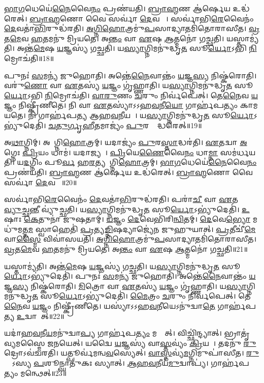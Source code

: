 \ul{𑌭𑌾}\ul{𑌗}𑌧𑍇𑌯𑍇॑\ul{𑌨𑍈}𑌵𑍈\ul{𑌨𑌂} 𑌪𑍍𑌰𑌣॑𑌯𑌤𑌿।
\ul{𑌬𑍍𑌰𑌾}\ul{𑌹𑍍𑌮}𑌣 𑌆॑𑌰𑍍\mbox{}\ul{𑌷𑍇}𑌯 𑌉𑌦𑍍𑌧॑𑌰𑍇𑌤𑍍।
\ul{𑌬𑍍𑌰𑌾}\ul{𑌹𑍍𑌮}𑌣𑍋 𑌵𑍈 𑌸𑌰𑍍𑌵𑌾॑ \ul{𑌦𑍇}𑌵𑌤𑌾𑌃᳚।
𑌸𑌰𑍍𑌵𑌾॑𑌭𑌿\ul{𑌰𑍇}𑌵𑍈𑌨𑌂॑ \ul{𑌦𑍇}𑌵𑌤𑌾॑\ul{𑌭𑌿}𑌰𑍁𑌦𑍍𑌧॑𑌰𑌤𑌿।
\ul{𑌅}\ul{𑌗𑍍𑌨𑌿}\ul{𑌹𑍋}𑌤𑍍𑌰𑌮𑍁॑\ul{𑌪}𑌸𑌾𑌦𑍍𑌯𑌾𑌤𑌮𑌿॑𑌤𑍋𑌰𑌾𑌸𑍀𑌤।
\ul{𑌵𑍍𑌰}𑌤\ul{𑌮𑍇}𑌵 \ul{𑌹}𑌤𑌮𑌨𑍁॑ 𑌮𑍍𑌰𑌿𑌯𑌤𑍇।
𑌅\ul{𑌨𑍍𑌤𑌂} 𑌵𑌾 \ul{𑌏}𑌷 \ul{𑌆}𑌤𑍍𑌮𑌨𑍋॑ 𑌗𑌚𑍍𑌛𑌤𑌿।
𑌯𑌸𑍍𑌤𑌾𑌮𑍍𑌯॑𑌤𑌿।
𑌅𑌨𑍍𑌤॑\ul{𑌮𑍇}𑌷 \ul{𑌯}𑌜𑍍𑌞𑌸𑍍𑌯॑ 𑌗𑌚𑍍𑌛𑌤𑌿।
𑌯\ul{𑌸𑍍𑌯𑌾}𑌗𑍍𑌨𑌿𑌮𑌨𑍁॑𑌦𑍍𑌧𑍃\ul{𑌤}\ul{} 𑌸𑍂\ul{𑌰𑍍𑌯𑍋}𑌽𑌭𑌿 \ul{𑌨𑌿}𑌮𑍍𑌰𑍋𑌚॑𑌤𑌿॥18॥

𑌪𑍁𑌨𑌃॑ \ul{𑌸}𑌮𑌨𑍍𑌯॑ 𑌜𑍁𑌹𑍋𑌤𑌿।
𑌅𑌨𑍍𑌤𑍇॑\ul{𑌨𑍈}𑌵𑌾𑌨𑍍𑌤𑌂॑ \ul{𑌯}𑌜𑍍𑌞\ul{𑌸𑍍𑌯} 𑌨𑌿𑌷𑍍𑌕॑𑌰𑍋𑌤𑌿।
𑌵𑌰𑍁॑\ul{𑌣𑍋} 𑌵𑌾 \ul{𑌏}𑌤𑌸𑍍𑌯॑ \ul{𑌯}𑌜𑍍𑌞𑌂 𑌗𑍃॑𑌹𑍍𑌣𑌾𑌤𑌿।
𑌯\ul{𑌸𑍍𑌯𑌾}𑌗𑍍𑌨𑌿𑌮𑌨𑍁॑𑌦𑍍𑌧𑍃\ul{𑌤}\ul{} 𑌸𑍂\ul{𑌰𑍍𑌯𑍋}𑌽𑌭𑌿 \ul{𑌨𑌿}𑌮𑍍𑌰𑍋𑌚॑𑌤𑌿।
\ul{𑌵𑌾}\ul{𑌰𑍁}𑌣𑌂 \ul{𑌚}𑌰𑍁𑌂 𑌨𑌿𑌰𑍍𑌵॑𑌪𑍇𑌤𑍍।
𑌤𑍇\ul{𑌨𑍈}𑌵 \ul{𑌯}𑌜𑍍𑌞𑌂 𑌨𑌿𑌷𑍍𑌕𑍍𑌰𑍀॑𑌣𑍀𑌤𑍇।
𑌨𑌿 𑌵𑌾 \ul{𑌏}𑌤𑌸𑍍𑌯𑌾॑\-𑌽𑌽𑌹\ul{𑌵}𑌨𑍀\ul{𑌯𑍋} 𑌗𑌾𑌰𑍍\mbox{}𑌹॑𑌪𑌤𑍍𑌯𑌂 𑌕𑌾𑌮𑌯𑌤𑍇।
𑌨𑌿 𑌗𑌾𑌰𑍍\mbox{}𑌹॑𑌪𑌤𑍍𑌯 𑌆𑌹\ul{𑌵}𑌨𑍀𑌯𑌮𑍍᳚।
𑌯\ul{𑌸𑍍𑌯𑌾}𑌗𑍍𑌨𑌿𑌮𑌨𑍁॑𑌦𑍍𑌧𑍃\ul{𑌤}\ul{} 𑌸𑍂\ul{𑌰𑍍𑌯𑍋}\-𑌽𑌭𑍍𑌯𑍁॑𑌦𑍇𑌤𑌿॑।
\ul{𑌚}\ul{𑌤𑍁}\ul{𑌰𑍍𑌗𑍃}\ul{𑌹𑍀}𑌤𑌮𑌾𑌜𑍍𑌯𑌂॑ \ul{𑌪𑍁}𑌰𑌸𑍍𑌤𑌾᳚𑌦𑍍𑌧𑌰𑍇𑌤𑍍॥19॥

𑌅\ul{𑌥𑌾}𑌗𑍍𑌨𑌿𑌮𑍍।
𑌅𑌥𑌾᳚𑌗𑍍𑌨𑌿\ul{𑌹𑍋}𑌤𑍍𑌰𑌮𑍍।
𑌯𑌦𑌾𑌜𑍍𑌯𑌂॑ \ul{𑌪𑍁}𑌰\ul{𑌸𑍍𑌤𑌾}𑌦𑍍𑌧𑌰॑𑌤𑌿।
\ul{𑌏}𑌤𑌦𑍍𑌵𑌾 \ul{𑌅}𑌗𑍍𑌨𑍇𑌃 \ul{𑌪𑍍𑌰𑌿}𑌯𑌂 𑌧𑌾𑌮॑।
𑌯𑌦𑌾𑌜𑍍𑌯𑌮𑍍᳚।
\ul{𑌪𑍍𑌰𑌿}𑌯𑍇\ul{𑌣𑍈}𑌵𑍈\ul{𑌨𑌂} 𑌧𑌾\ul{𑌮𑍍𑌨𑌾} 𑌸𑌮॑𑌰𑍍𑌧𑌯𑌤𑌿।
𑌯\ul{𑌦}𑌗𑍍𑌨𑌿𑌂 𑌪𑍂\ul{𑌰𑍍𑌵}\ul{} 𑌹\ul{𑌰}𑌤𑍍𑌯𑌥𑌾᳚𑌗𑍍𑌨𑌿\ul{𑌹𑍋}𑌤𑍍𑌰𑌮𑍍।
\ul{𑌭𑌾}\ul{𑌗}𑌧𑍇𑌯𑍇॑\ul{𑌨𑍈}𑌵𑍈\ul{𑌨𑌂} 𑌪𑍍𑌰𑌣॑𑌯𑌤𑌿।
\ul{𑌬𑍍𑌰𑌾}\ul{𑌹𑍍𑌮}𑌣 𑌆॑𑌰𑍍\mbox{}\ul{𑌷𑍇}𑌯 𑌉𑌦𑍍𑌧॑𑌰𑍇𑌤𑍍।
\ul{𑌬𑍍𑌰𑌾}\ul{𑌹𑍍𑌮}𑌣𑍋 𑌵𑍈 𑌸𑌰𑍍𑌵𑌾॑ \ul{𑌦𑍇}𑌵𑌤𑌾𑌃᳚॥20॥

𑌸𑌰𑍍𑌵𑌾॑𑌭𑌿\ul{𑌰𑍇}𑌵𑍈𑌨𑌂॑ \ul{𑌦𑍇}𑌵𑌤𑌾॑\ul{𑌭𑌿}𑌰𑍁𑌦𑍍𑌧॑𑌰𑌤𑌿।
𑌪𑌰𑌾॑\ul{𑌚𑍀} 𑌵𑌾 \ul{𑌏}𑌤𑌸𑍍𑌮𑍈᳚ \ul{𑌵𑍍𑌯𑍁}𑌚𑍍𑌛\ul{𑌨𑍍𑌤𑍀} 𑌵𑍍𑌯𑍁॑𑌚𑍍𑌛𑌤𑌿।
𑌯\ul{𑌸𑍍𑌯𑌾}𑌗𑍍𑌨𑌿𑌮𑌨𑍁॑𑌦𑍍𑌧𑍃\ul{𑌤}\ul{} 𑌸𑍂\ul{𑌰𑍍𑌯𑍋}\-𑌽𑌭𑍍𑌯𑍁॑𑌦𑍇𑌤𑌿॑।
\ul{𑌉}𑌷𑌾𑌃 \ul{𑌕𑍇}𑌤𑍁𑌨𑌾॑ 𑌜𑍁𑌷𑌤𑌾𑌮𑍍।
\ul{𑌯}𑌜𑍍𑌞𑌂 \ul{𑌦𑍇}𑌵𑍇𑌭𑌿॑𑌰𑌿\ul{𑌨𑍍𑌵𑌿}𑌤𑌮𑍍।
\ul{𑌦𑍇}𑌵𑍇\ul{𑌭𑍍𑌯𑍋} 𑌮𑌧𑍁॑𑌮𑌤𑍍𑌤\ul{𑌮}\ul{} 𑌸𑍍𑌵𑌾𑌹𑍇𑌤𑌿॑ \ul{𑌪𑍍𑌰}𑌤𑍍𑌯\ul{𑌙𑍍𑌨𑌿}𑌷𑌦𑍍𑌯𑌾𑌜𑍍𑌯𑍇॑𑌨 𑌜𑍁𑌹𑍁𑌯𑌾𑌤𑍍।
\ul{𑌪𑍍𑌰}𑌤𑍀𑌚𑍀॑\ul{𑌮𑍇}𑌵𑌾\ul{𑌸𑍍𑌮𑍈} 𑌵𑌿𑌵𑌾॑𑌸𑌯𑌤𑌿।
\ul{𑌅}\ul{𑌗𑍍𑌨𑌿}\ul{𑌹𑍋}𑌤𑍍𑌰𑌮𑍁॑\ul{𑌪}𑌸𑌾𑌦𑍍𑌯𑌾𑌤𑌮𑌿॑𑌤𑍋𑌰𑌾𑌸𑍀𑌤।
\ul{𑌵𑍍𑌰}𑌤\ul{𑌮𑍇}𑌵 \ul{𑌹}𑌤𑌮𑌨𑍁॑ 𑌮𑍍𑌰𑌿𑌯𑌤𑍇।
𑌅\ul{𑌨𑍍𑌤𑌂} 𑌵𑌾 \ul{𑌏}𑌷 \ul{𑌆}𑌤𑍍𑌮𑌨𑍋॑ 𑌗𑌚𑍍𑌛𑌤𑌿॥21॥

𑌯𑌸𑍍𑌤𑌾𑌮𑍍𑌯॑𑌤𑌿।
𑌅𑌨𑍍𑌤॑\ul{𑌮𑍇}𑌷 \ul{𑌯}𑌜𑍍𑌞𑌸𑍍𑌯॑ 𑌗𑌚𑍍𑌛𑌤𑌿।
𑌯\ul{𑌸𑍍𑌯𑌾}𑌗𑍍𑌨𑌿𑌮𑌨𑍁॑𑌦𑍍𑌧𑍃\ul{𑌤}\ul{} 𑌸𑍂\ul{𑌰𑍍𑌯𑍋}\-𑌽𑌭𑍍𑌯𑍁॑𑌦𑍇𑌤𑌿॑।
𑌪𑍁𑌨𑌃॑ \ul{𑌸}𑌮𑌨𑍍𑌯॑ 𑌜𑍁𑌹𑍋𑌤𑌿।
𑌅𑌨𑍍𑌤𑍇॑\ul{𑌨𑍈}𑌵𑌾𑌨𑍍𑌤𑌂॑ \ul{𑌯}𑌜𑍍𑌞\ul{𑌸𑍍𑌯} 𑌨𑌿𑌷𑍍𑌕॑𑌰𑍋𑌤𑌿।
\ul{𑌮𑌿}𑌤𑍍𑌰𑍋 𑌵𑌾 \ul{𑌏}𑌤𑌸𑍍𑌯॑ \ul{𑌯}𑌜𑍍𑌞𑌂 𑌗𑍃॑𑌹𑍍𑌣𑌾𑌤𑌿।
𑌯\ul{𑌸𑍍𑌯𑌾}𑌗𑍍𑌨𑌿𑌮𑌨𑍁॑𑌦𑍍𑌧𑍃\ul{𑌤}\ul{} 𑌸𑍂\ul{𑌰𑍍𑌯𑍋}\-𑌽𑌭𑍍𑌯𑍁॑𑌦𑍇𑌤𑌿॑।
\ul{𑌮𑍈}𑌤𑍍𑌰𑌂 \ul{𑌚}𑌰𑍁𑌂 𑌨𑌿𑌰𑍍𑌵॑𑌪𑍇𑌤𑍍।
𑌤𑍇\ul{𑌨𑍈}𑌵 \ul{𑌯}𑌜𑍍𑌞𑌂 𑌨𑌿𑌷𑍍𑌕𑍍𑌰𑍀॑𑌣𑍀𑌤𑍇।
𑌯𑌸𑍍𑌯𑌾॑\-𑌽𑌽𑌹\ul{𑌵}𑌨𑍀𑌯𑍇\-𑌽𑌨𑍁॑𑌦𑍍𑌵𑌾\ul{𑌤𑍇} 𑌗𑌾𑌰𑍍\mbox{}𑌹॑𑌪𑌤𑍍𑌯 \ul{𑌉}𑌦𑍍𑌵𑌾𑌯𑍇᳚𑌤𑍍॥22॥

𑌯𑌦𑌾॑𑌹\ul{𑌵}𑌨𑍀\ul{𑌯}𑌮𑌨𑍁॑𑌦𑍍𑌵𑌾\ul{𑌪𑍍𑌯} 𑌗𑌾𑌰𑍍\mbox{}𑌹॑𑌪\ul{𑌤𑍍𑌯𑌂} 𑌮𑌨𑍍𑌥𑍇᳚𑌤𑍍।
𑌵𑌿𑌚𑍍𑌛𑌿॑𑌨𑍍𑌦𑍍𑌯𑌾𑌤𑍍।
𑌭𑍍𑌰𑌾𑌤𑍃॑𑌵𑍍𑌯𑌮𑌸𑍍𑌮𑍈 𑌜𑌨𑌯𑍇𑌤𑍍।
𑌯𑌦𑍍𑌵𑍈 \ul{𑌯}𑌜𑍍𑌞𑌸𑍍𑌯॑ 𑌵𑌾\ul{𑌸𑍍𑌤}𑌵𑍍𑌯𑌂॑ \ul{𑌕𑍍𑌰𑌿}𑌯𑌤𑍇᳚।
𑌤𑌦𑌨𑍁॑ \ul{𑌰𑍁}𑌦𑍍𑌰𑍋\-𑌽𑌵॑𑌚𑌰𑌤𑌿।
𑌯𑌤𑍍𑌪𑍂𑌰𑍍𑌵॑𑌮𑌨𑍍𑌵\ul{𑌵}𑌸𑍍𑌯𑍇𑌤𑍍।
\ul{𑌵𑌾}\ul{𑌸𑍍𑌤}𑌵𑍍𑌯॑\ul{𑌮}𑌗𑍍𑌨𑌿𑌮𑍁𑌪𑌾॑𑌸𑍀𑌤।
\ul{𑌰𑍁}𑌦𑍍𑌰𑍋᳚𑌽𑌸𑍍𑌯 \ul{𑌪}𑌶𑍂𑌨𑍍𑌘𑌾𑌤𑍁॑𑌕𑌃 𑌸𑍍𑌯𑌾𑌤𑍍।
\ul{𑌆}\ul{𑌹}\ul{𑌵}𑌨𑍀𑌯॑\ul{𑌮𑍁}𑌦𑍍𑌵𑌾𑌪𑍍𑌯॑।
𑌗𑌾𑌰𑍍\mbox{}𑌹॑𑌪𑌤𑍍𑌯𑌂 𑌮𑌨𑍍𑌥𑍇𑌤𑍍॥23॥

